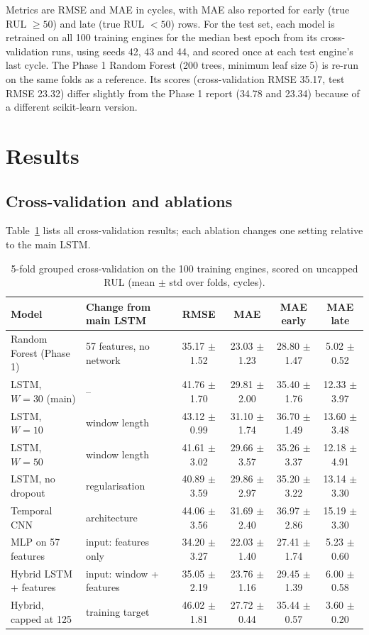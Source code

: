 \documentclass[conference]{IEEEtran}
\begin{document}
Metrics are RMSE and MAE in cycles, with MAE also reported for early (true RUL $\ge 50$) and late (true RUL $<50$) rows. For the test set, each model is retrained on all 100 training engines for the median best epoch from its cross-validation runs, using seeds 42, 43 and 44, and scored once at each test engine's last cycle. The Phase 1 Random Forest (200 trees, minimum leaf size 5) is re-run on the same folds as a reference. Its scores (cross-validation RMSE 35.17, test RMSE 23.32) differ slightly from the Phase 1 report (34.78 and 23.34) because of a different scikit-learn version.

\section{Results}
\subsection{Cross-validation and ablations}
Table~\ref{tab:cv} lists all cross-validation results; each ablation changes one setting relative to the main LSTM.

\begin{table}[t]
\centering
\caption{5-fold grouped cross-validation on the 100 training engines, scored on uncapped RUL (mean $\pm$ std over folds, cycles).}
\label{tab:cv}
\begin{tabular}{llcccc}
\toprule
Model & Change from main LSTM & RMSE & MAE & MAE early & MAE late \\
\midrule
Random Forest (Phase 1) & 57 features, no network & 35.17 $\pm$ 1.52 & 23.03 $\pm$ 1.23 & 28.80 $\pm$ 1.47 & 5.02 $\pm$ 0.52 \\
\midrule
LSTM, $W=30$ (main) & -- & 41.76 $\pm$ 1.70 & 29.81 $\pm$ 2.00 & 35.40 $\pm$ 1.76 & 12.33 $\pm$ 3.97 \\
LSTM, $W=10$ & window length & 43.12 $\pm$ 0.99 & 31.10 $\pm$ 1.74 & 36.70 $\pm$ 1.49 & 13.60 $\pm$ 3.48 \\
LSTM, $W=50$ & window length & 41.61 $\pm$ 3.02 & 29.66 $\pm$ 3.57 & 35.26 $\pm$ 3.37 & 12.18 $\pm$ 4.91 \\
LSTM, no dropout & regularisation & 40.89 $\pm$ 3.59 & 29.86 $\pm$ 2.97 & 35.20 $\pm$ 3.22 & 13.14 $\pm$ 3.30 \\
Temporal CNN & architecture & 44.06 $\pm$ 3.56 & 31.69 $\pm$ 2.40 & 36.97 $\pm$ 2.86 & 15.19 $\pm$ 3.30 \\
MLP on 57 features & input: features only & 34.20 $\pm$ 3.27 & 22.03 $\pm$ 1.40 & 27.41 $\pm$ 1.74 & 5.23 $\pm$ 0.60 \\
Hybrid LSTM + features & input: window + features & 35.05 $\pm$ 2.19 & 23.76 $\pm$ 1.16 & 29.45 $\pm$ 1.39 & 6.00 $\pm$ 0.58 \\
Hybrid, capped at 125 & training target & 46.02 $\pm$ 1.81 & 27.72 $\pm$ 0.44 & 35.44 $\pm$ 0.57 & 3.60 $\pm$ 0.20 \\
\bottomrule
\end{tabular}
\end{table}
\end{document}
